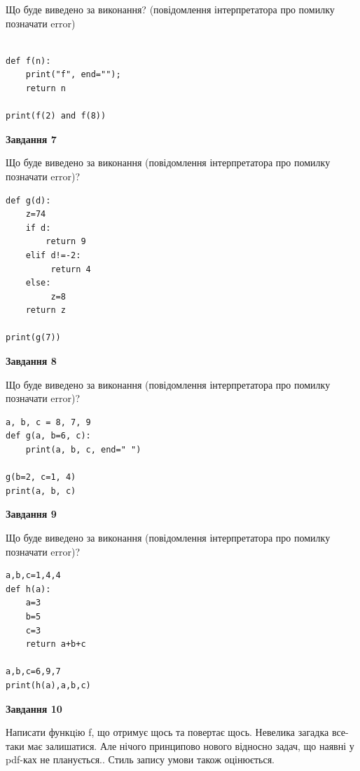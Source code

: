 \documentclass[12pt, ukrainian]{article}
\begin{document}
{\begin {large}
Що буде виведено за виконання? (повідомлення інтерпретатора про помилку позначати error)\par
\begin{verbatim}

def f(n):
    print("f", end="");
    return n

print(f(2) and f(8))
\end{verbatim}

{\begin {center}\textbf{Завдання 7}\end {center}}

Що буде виведено за виконання (повідомлення інтерпретатора про помилку позначати error)?\par
\begin{verbatim}
def g(d):
    z=74
    if d: 
        return 9
    elif d!=-2:
         return 4
    else:
         z=8
    return z

print(g(7))
\end{verbatim}

{\begin {center}\textbf{Завдання 8}\end {center}}

Що буде виведено за виконання (повідомлення інтерпретатора про помилку позначати error)?\par
\begin{verbatim}
a, b, c = 8, 7, 9
def g(a, b=6, c):
    print(a, b, c, end=" ")

g(b=2, c=1, 4)
print(a, b, c)
\end{verbatim}

{\begin {center}\textbf{Завдання 9}\end {center}}

Що буде виведено за виконання (повідомлення інтерпретатора про помилку позначати error)?\par
\begin{verbatim}
a,b,c=1,4,4
def h(a):
    a=3
    b=5
    c=3
    return a+b+c

a,b,c=6,9,7
print(h(a),a,b,c)
\end{verbatim}

{\begin {center}\textbf{Завдання 10}\end {center}}


Написати функцiю f, що отримує щось та повертає щось. Невелика загадка все-таки має залишатися. Але нічого принципово нового відносно задач, що наявні у pdf-ках не планується.. Стиль запису умови також оцінюється.\par
\end {large}}
\newpage
\end{document}
